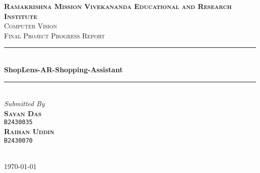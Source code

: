 \begin{titlepage}
	\newcommand{\HRule}{\rule{\linewidth}{0.5mm}}
	\center


	\textsc{\LARGE \textbf{Ramakrishna Mission Vivekananda Educational and Research Institute}}\\[1.5cm]

	\textsc{\LARGE Computer Vision}\\[0.5cm]

	\textsc{\large Final Project Progress Report}\\[0.5cm]

	\HRule\\[0.4cm]

	{\huge\bfseries ShopLens-AR-Shopping-Assistant}\\[0.4cm]

	\HRule\\[1.5cm]



\large
\textit{Submitted By}\\
\textsc{\textbf{Sayan Das }}\\
\vspace{-0.5em}
\textsc{\texttt{B2430035 }}\\
\textsc{\textbf{Raihan Uddin }}\\
\vspace{-0.5em}
\textsc{\texttt{B2430070 }}\\

	~
	\begin{minipage}{0.4\textwidth}
	\end{minipage}


	\vfill\vfill\vfill

	{\large \today}

	\vfill

\end{titlepage}
\restoregeometry